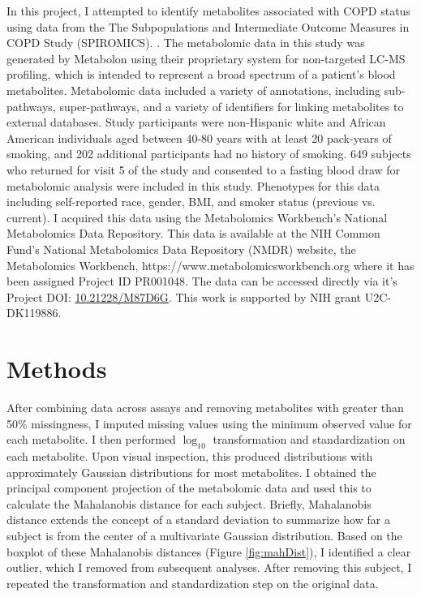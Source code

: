 \documentclass{article}
\begin{document}
In this project, I attempted to identify metabolites associated with COPD status using data from the The Subpopulations and Intermediate Outcome Measures in COPD Study (SPIROMICS). \cite{gillenwaterPlasmaMetabolomicSignatures2020}. The metabolomic data in this study was generated by Metabolon using their proprietary system for non-targeted LC-MS profiling, which is intended to represent a broad spectrum of a patient's blood metabolites. Metabolomic data included a variety of annotations, including sub-pathways, super-pathways, and a variety of identifiers for linking metabolites to external databases. Study participants were non-Hispanic white and African American individuals aged between 40-80 years with at least 20 pack-years of smoking, and 202 additional participants had no history of smoking. 649 subjects who returned for visit 5 of the study and consented to a fasting blood draw for metabolomic analysis were included in this study. Phenotypes for this data including self-reported race, gender, BMI, and smoker status (previous vs. current). I acquired this data using the Metabolomics Workbench's National Metabolomics Data Repository. This data is available at the NIH Common Fund's National Metabolomics Data Repository (NMDR) website, the Metabolomics Workbench, https://www.metabolomicsworkbench.org where it has been assigned Project ID PR001048. The data can be accessed directly via it's Project DOI: \href{http://dx.doi.org/10.21228/M87D6G}{10.21228/M87D6G}. This work is supported by NIH grant U2C-DK119886.


\section*{Methods}
After combining data across assays and removing metabolites with greater than 50\% missingness, I imputed missing values using the minimum observed value for each metabolite. I then performed \(\log_{10}\) transformation and standardization on each metabolite. Upon visual inspection, this produced distributions with approximately Gaussian distributions for most metabolites. I obtained the principal component projection of the metabolomic data and used this to calculate the Mahalanobis distance for each subject. Briefly, Mahalanobis distance extends the concept of a standard deviation to summarize how far a subject is from the center of a multivariate Gaussian distribution. Based on the boxplot of these Mahalanobis distances (Figure \ref{fig:mahDist}), I identified a clear outlier, which I removed from subsequent analyses. After removing this subject, I repeated the transformation and standardization step on the original data.
\end{document}
